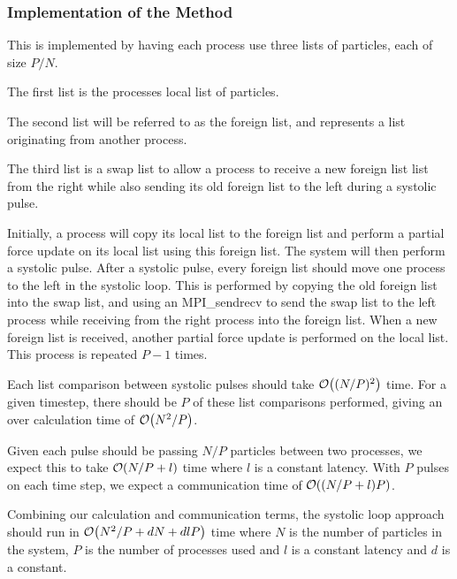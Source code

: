 %
%

\subsubsection{Implementation of the \pairoperation{} Method}
This is implemented by having each process use three lists of particles,
each of size $P/N$.

The first list is the processes local list of particles.

The second list will be referred to as the foreign list, and
represents a list originating from another process.

The third list is a swap list to allow a process to receive a new
foreign list list from the right
while also sending its old foreign list to the left
during a systolic pulse.

Initially, a process will copy its local list to the foreign list
and perform a partial force update on its local list using this
foreign list.
%
The system will then perform a systolic pulse.
After a systolic pulse, every foreign list should move one process
to the left in the systolic loop.
%
This is performed by copying the old foreign list into the
swap list, and using an MPI\_sendrecv to send the swap list to
the left process while receiving from
the right process into the foreign list.
%
When a new foreign list is received, another partial force update
is performed on the local list.
%
This process is repeated $P-1$ times.

Each list comparison between systolic pulses should take $\mathcal{O}{\left({ (N/P)^2 }\right)}$ time.
%
For a given timestep, there should be $P$ of these list comparisons
performed, giving an over calculation time of $\mathcal{O}{\left({ N^2/P }\right)}$.

Given each pulse should be passing $N/P$ particles between two processes,
we expect this to take $\mathcal{O}{\left({ N/P + l }\right)}$ time where $l$ is a constant latency.
%
With $P$ pulses on each time step, we expect a communication time of
$\mathcal{O}{\left({ (N/P + l)P }\right)}$.

Combining our calculation and communication terms, the systolic loop approach
should run in $\mathcal{O}{\left({ N^2/P + dN + dlP }\right)}$ time
where $N$ is the number of particles in the system,
$P$ is the number of processes used and
$l$ is a constant latency and
$d$ is a constant.

\begin{figure}[!h]
    
    \caption{}
    \label{fig:v0_systolic_pair_operation_512_logtime}
\end  {figure}

